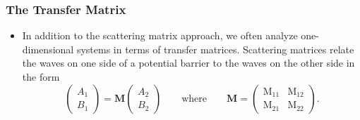 \documentclass[11pt, a4paper]{article}
\newcommand{\mat}[1]{\mathbf{#1}}  %
\newcommand{\M}{\mat{M}}  %
\newcommand{\MM}{\mathrm{M}}  %
\begin{document}
\subsubsection{The Transfer Matrix}
\begin{itemize}
    \item In addition to the scattering matrix approach, we often analyze one-dimensional systems in terms of transfer matrices. Scattering matrices relate the waves on one side of a potential barrier to the waves on the other side in the form
    \begin{equation*}
        \begin{pmatrix}
            A_{1}\\
            B_{1}
        \end{pmatrix}
        = \M
        \begin{pmatrix}
            A_{2}\\
            B_{2}
        \end{pmatrix}
        \qquad \text{where} \qquad \M = 
        \begin{pmatrix}
            \MM_{11} & \MM_{12}\\
            \MM_{21} & \MM_{22}
        \end{pmatrix}.
    \end{equation*}
    

\end{itemize}
\end{document}
